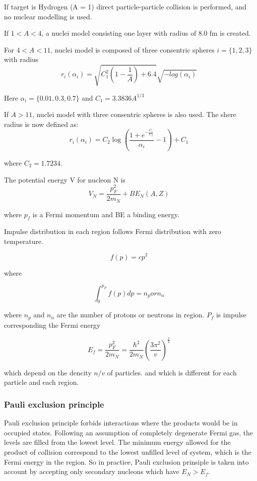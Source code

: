 If target is Hydrogen (A = 1) direct particle-particle collision is performed, 
and no nuclear modelling is used. 

If $1 < A < 4$, a nuclei model consisting one layer with radius of 8.0 fm is created.

For $4 < A < 11$, nuclei model is composed of three consentric spheres $i = \{1, 2, 3\}$ with radius
$$r_{i}(\alpha_{i}) = \sqrt{C_{1}^{2} (1 - \frac{1}{A}) + 6.4} \sqrt{-log( \alpha_{i})}$$

Here $\alpha_{i} = \{0.01, 0.3, 0.7\}$ and $C_{1} = 3.3836 A^{1/3}$

If $A > 11$, nuclei model with three consentric spheres is also used. The shere radius is now defined as:
$$r_{i}(\alpha_{i}) =  C_{2} \log({\frac{1 + e^{- \frac{C_{1}}{C_{2}}}}{\alpha_{i}} - 1}) + C_{1}$$

where $C_{2} = 1.7234$.

The potential energy V for nucleon N is
$$ V_{N} = \frac{p_{F}^2}{2 m_{N}} + BE_{N}(A, Z)$$

where $p_f$ is a Fermi momentum and BE a binding energy. 
 
Impulse distribution in each region follows Fermi distribution with zero temperature.

\begin{equation}
 f(p) = c p ^2
 \end{equation}

 where

 \begin{equation}
 \int_0^{p_F} f(p) dp = n_{p}   or  n_{n}
 \end{equation}

 where $n_p$ and $n_n$ are the number of protons or neutrons in region.
 $P_f$ is impulse corresponding the Fermi energy

 \begin{equation}
 E_f = \frac{p_F^2}{2 m_N} = \frac{\hbar^2}{2 m_N}(\frac{3 \pi^{2}}{v})^\frac{2}{3}
 \end{equation}
 
 which depend on the dencity $n/v$ of particles. 
 and which is different for each particle and each region. 

\subsubsection{Pauli exclusion principle}
Pauli exclusion principle forbids interactions where the products would be in occupied states.
Following an assumption of completely degenerate Fermi gas, the levels are filled from the lowest level.
The minimum energy allowed for the product of collision correspond to the lowest unfilled level of system, which is the Fermi energy in the region. 
So in practice, Pauli exclusion prinsiple is taken into account by accepting only secondary nucleons which have $E_N > E_f$.



